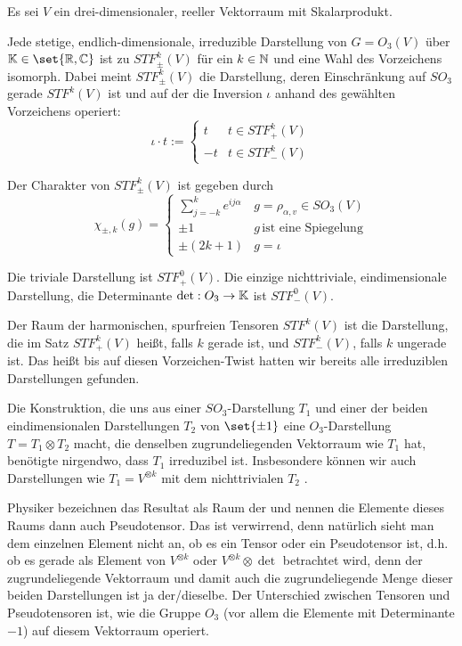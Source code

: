 \begin{corollary}
Es sei $V$ ein drei-dimensionaler, reeller Vektorraum mit Skalarprodukt.

Jede stetige, endlich-dimensionale, irreduzible Darstellung von $G=O_3(V)$ über $\IK\in\set{\IR,\IC}$ ist zu $STF_{\pm}^k(V)$ für ein $k\in\mathbb{N}$ und eine Wahl des Vorzeichens isomorph. Dabei meint $STF_{\pm}^k(V)$ die Darstellung, deren Einschränkung auf $SO_3$ gerade $STF^k(V)$ ist und auf der die Inversion $\iota$ anhand des gewählten Vorzeichens operiert:
\[\iota \cdot t := \begin{cases}
t & t\in STF_+^k(V) \\
-t & t\in STF_-^k(V)
\end{cases}\]

Der Charakter von $STF_{\pm}^k(V)$ ist gegeben durch
\[\chi_{\pm,k}(g) = \begin{cases}
\sum_{j=-k}^k e^{ij\alpha} & g=\rho_{\alpha,v}\in SO_3(V) \\
\pm 1 & g\,\text{ist eine Spiegelung} \\
\pm (2k+1) & g=\iota
\end{cases}\]
\end{corollary}

\begin{remark}
Die triviale Darstellung ist $STF_+^0(V)$. Die einzige nichttriviale, eindimensionale Darstellung, die Determinante $\det: O_3 \to \mathbb{K}$ ist $STF_-^0(V)$.

Der Raum der harmonischen, spurfreien Tensoren $STF^k(V)$ ist die Darstellung, die im Satz $STF_+^k(V)$ heißt, falls $k$ gerade ist, und $STF_-^k(V)$, falls $k$ ungerade ist. Das heißt bis auf diesen Vorzeichen-Twist hatten wir bereits alle irreduziblen Darstellungen gefunden.
\end{remark}

\begin{remark}
Die Konstruktion, die uns aus einer $SO_3$-Darstellung $T_1$ und einer der beiden eindimensionalen Darstellungen $T_2$ von $\set{\pm 1}$ eine $O_3$-Darstellung $T=T_1\otimes T_2$ macht, die denselben zugrundeliegenden Vektorraum wie $T_1$ hat, benötigte nirgendwo, dass $T_1$ irreduzibel ist. Insbesondere können wir auch Darstellungen wie $T_1=V^{\otimes k}$ mit dem nichttrivialen $T_2$ .

Physiker bezeichnen das Resultat als Raum der  und nennen die Elemente dieses Raums dann auch Pseudotensor. Das ist verwirrend, denn natürlich sieht man dem einzelnen Element nicht an, ob es ein Tensor oder ein Pseudotensor ist, d.h. ob es gerade als Element von $V^{\otimes k}$ oder $V^{\otimes k}\otimes\det$ betrachtet wird, denn der zugrundeliegende Vektorraum und damit auch die zugrundeliegende Menge dieser beiden Darstellungen ist ja der/dieselbe. Der Unterschied zwischen Tensoren und Pseudotensoren ist, wie die Gruppe $O_3$ (vor allem die Elemente mit Determinante $-1$) auf diesem Vektorraum operiert.
\end{remark}
